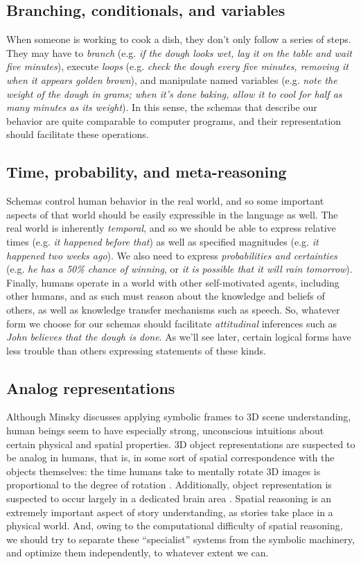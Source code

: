 \subsection{Branching, conditionals, and variables}
When someone is working to cook a dish, they don't only follow a series of steps. They may have to \textit{branch} (e.g. \textit{if the dough looks wet, lay it on the table and wait five minutes}), execute \textit{loops} (e.g. \textit{check the dough every five minutes, removing it when it appears golden brown}), and manipulate named variables (e.g. \textit{note the weight of the dough in grams; when it's done baking, allow it to cool for half as many minutes as its weight}). In this sense, the schemas that describe our behavior are quite comparable to computer programs, and their representation should facilitate these operations.

\subsection{Time, probability, and meta-reasoning}
Schemas control human behavior in the real world, and so some important aspects of that world should be easily expressible in the language as well. The real world is inherently \textit{temporal}, and so we should be able to express relative times (e.g. \textit{it happened before that}) as well as specified magnitudes (e.g. \textit{it happened two weeks ago}). We also need to express \textit{probabilities and certainties} (e.g. \textit{he has a 50\% chance of winning}, or \textit{it is possible that it will rain tomorrow}). Finally, humans operate in a world with other self-motivated agents, including other humans, and as such must reason about the knowledge and beliefs of others, as well as knowledge transfer mechanisms such as speech. So, whatever form we choose for our schemas should facilitate \textit{attitudinal} inferences such as \textit{John believes that the dough is done}. As we'll see later, certain logical forms have less trouble than others expressing statements of these kinds.
    
\subsection{Analog representations}
Although Minsky discusses applying symbolic frames to 3D scene understanding, human beings seem to have especially strong, unconscious intuitions about certain physical and spatial properties. 3D object representations are suspected to be analog in humans, that is, in some sort of spatial correspondence with the objects themselves: the time humans take to mentally rotate 3D images is proportional to the degree of rotation \citep{cooper1973chronometric}. Additionally, object representation is suspected to occur largely in a dedicated brain area \citep{rosenberg2013visual}. Spatial reasoning is an extremely important aspect of story understanding, as stories take place in a physical world. And, owing to the computational difficulty of spatial reasoning, we should try to separate these ``specialist'' systems from the symbolic machinery, and optimize them independently, to whatever extent we can.
    

